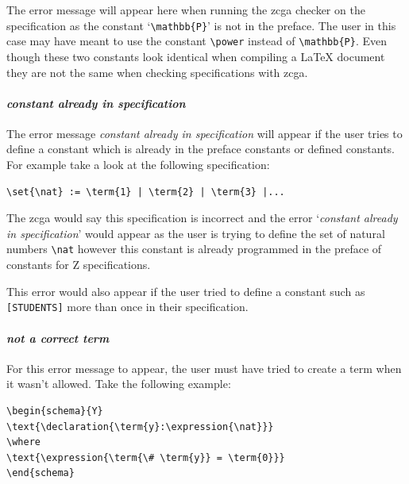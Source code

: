 The error message will appear here when running the \gls{zcga} checker on the
specification as the constant `\verb|\mathbb{P}|' is not in the preface. The
user in this case may have meant to use the constant \verb|\power| instead of
\verb|\mathbb{P}|. Even though these two constants look identical when compiling
a \LaTeX{} document they are not the same when checking specifications with
\gls{zcga}.

\paragraph{\emph{constant already in specification}}

The error message \emph{constant already in specification} will appear if the
user tries to define a constant which is already in the preface constants or
defined constants. For example take a look at the following specification:

\begin{exam}
\begin{verbatim}
\set{\nat} := \term{1} | \term{2} | \term{3} |...
\end{verbatim}
\end{exam}

The \gls{zcga} would say this specification is incorrect and the error
`\emph{constant already in specification}' would appear as the user is trying to
define the set of natural numbers \verb|\nat| however this constant is already
programmed in the preface of constants for Z specifications.

This error would also appear if the user tried to define a constant such as
\verb|[STUDENTS]| more  than once in their specification.

\paragraph{\emph{not a correct term}}

For this error message to appear, the user must have tried to create a term when
it wasn't allowed. Take the following example:

\begin{exam}
\begin{verbatim}       
\begin{schema}{Y}
\text{\declaration{\term{y}:\expression{\nat}}}
\where
\text{\expression{\term{\# \term{y}} = \term{0}}}
\end{schema}
\end{verbatim}
\end{exam}

